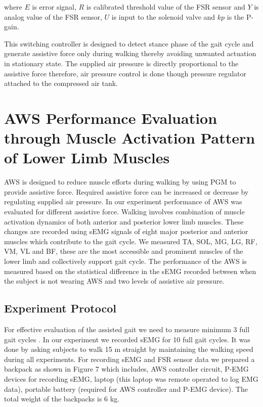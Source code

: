 \documentclass[letterpaper, 10 pt, conference]{ieeeconf}  %
\begin{document}
where $E$ is error signal, $R$ is calibrated threshold value of the FSR sensor and $Y$ is analog value of the FSR sensor, $U$ is input to the solenoid valve and $kp$ is the P-gain. 

This switching controller is designed to detect stance phase of the gait cycle and generate assistive force only during walking thereby avoiding unwanted actuation in stationary state. The supplied air pressure is directly proportional to the assistive force therefore, air pressure control is done though pressure regulator attached to the compressed air tank.


\section{AWS Performance Evaluation through Muscle Activation Pattern of Lower Limb Muscles} \label{Evaluation}
AWS is designed to reduce muscle efforts during walking by using PGM to provide assistive force. Required assistive force can be increased or decrease by regulating supplied air pressure. In our experiment performance of AWS was evaluated for different assistive force. Walking involves combination of muscle activation dynamics of both anterior and posterior lower limb muscles. These changes are recorded using sEMG signals of eight major posterior and anterior muscles which contribute to the gait cycle. We measured TA, SOL, MG, LG, RF, VM, VL and BF, these are the most accessible and prominent muscles of the lower limb and collectively support gait cycle. The performance of the AWS is measured based on the statistical difference in the sEMG recorded between when the subject is not wearing AWS and two levels of assistive air pressure.

\subsection{Experiment Protocol}
For effective evaluation of the assisted gait we need to measure minimum 3 full gait cycles \cite{10}. In our experiment we recorded sEMG for 10 full gait cycles. It was done by asking subjects to walk 15 m straight by maintaining the walking speed during all experiments. For recording sEMG and FSR sensor data we prepared a backpack as shown in Figure 7 which includes, AWS controller circuit, P-EMG devices for recording sEMG, laptop (this laptop was remote operated to log EMG data), portable battery (required for AWS controller and P-EMG device). The total weight of the backpacks is 6 kg.
\end{document}
